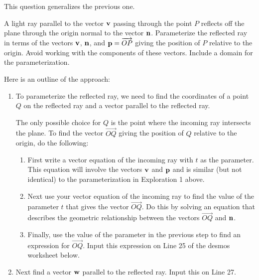 \documentclass{ximera}
\begin{document}
\begin{question}  \label{Q324g4t324r}
This question generalizes the previous one.

A light ray parallel to the vector ${\bf v}$ passing through the point $P$ reflects off the plane through the origin normal to the vector ${\bf n}$. Parameterize the reflected ray in terms of the vectors ${\bf v}$, ${\bf n}$, and ${\bf p} = \overrightarrow{OP}$ giving the position of $P$ relative to the origin. Avoid working with the components of these vectors. Include a domain for the parameterization.

Here is an outline of the approach:

\begin{enumerate}
\item To parameterize the reflected ray, we need to find the coordinates of a point $Q$ on the reflected ray and a vector parallel to the reflected ray. 

The only possible choice for $Q$ is the point where the incoming ray intersects the plane. To find the vector $\overrightarrow{OQ}$ giving the position of $Q$ relative to the origin, do the following:

\begin{enumerate}

\item{First write a vector equation of the incoming ray with $t$ as the parameter. This equation will involve the vectors ${\bf v}$ and ${\bf  p}$ and is similar (but not identical) to the parameterization in Exploration 1 above.} 

\item{Next use your vector equation of the incoming ray to find the value of the parameter $t$ that gives the vector $\overrightarrow{OQ}$. Do this by solving an equation that describes the geometric relationship between the vectors $\overrightarrow{OQ}$ and ${\bf n}$. }

\item{Finally, use the value of the parameter in the previous step to find an expression for $\overrightarrow{OQ}$. Input this expression on Line 25 of the desmos worksheet below.}

\end{enumerate}

\item Next find a vector ${\bf w}$ parallel to the reflected ray. Input this on Line 27. %


\end{enumerate}
\end{question}
\end{document}
